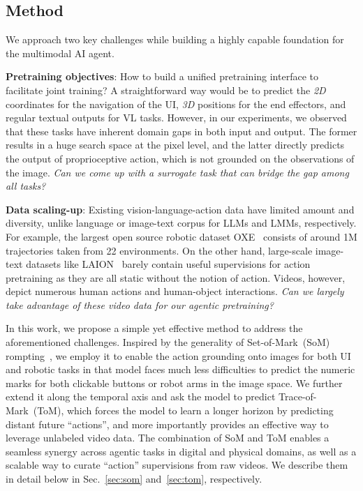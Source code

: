 \subsection{Method}

We approach two key challenges while building a highly capable foundation for the multimodal AI agent. 

\noindent \textbf{Pretraining objectives}: How to build a unified pretraining interface to facilitate joint training? A straightforward way would be to predict the \textit{2D} coordinates for the navigation of the UI, \textit{ 3D} positions for the end effectors, and regular textual outputs for VL tasks. However, in our experiments, we observed that these tasks have inherent domain gaps in both input and output. The former results in a huge search space at the pixel level, and the latter directly predicts the output of proprioceptive action, which is not grounded on the observations of the image. \textit{Can we come up with a surrogate task that can bridge the gap among all tasks?}

\noindent \textbf{Data scaling-up}: Existing vision-language-action data have limited amount and diversity, unlike language or image-text corpus for LLMs and LMMs, respectively. 
For example, the largest open source robotic dataset OXE~\cite{open_x_embodiment_rt_x_2023} consists of around 1M trajectories taken from 22 environments. On the other hand, large-scale image-text datasets like LAION~\cite{schuhmann2021laion} barely contain useful supervisions for action pretraining as they are all static without the notion of action. Videos, however, depict numerous human actions and human-object interactions.\textit{ Can we largely take advantage of these video data for our agentic pretraining?}

In this work, we propose a simple yet effective method to address the aforementioned challenges. Inspired by the generality of Set-of-Mark~(SoM) rompting~\cite{yang2023set}, we employ it to enable the action grounding onto images for both UI and robotic tasks in that model faces much less difficulties to predict the numeric marks for both clickable buttons or robot arms in the image space. We further extend it along the temporal axis and ask the model to predict Trace-of-Mark~(ToM), which forces the model to learn a longer horizon by predicting distant future ``actions'', and more importantly provides an effective way to leverage unlabeled video data. The combination of SoM and ToM enables a seamless synergy across agentic tasks in digital and physical domains, as well as a scalable way to curate ``action'' supervisions from raw videos. We describe them in detail below in Sec.~\ref{sec:som} and~\ref{sec:tom}, respectively. 

